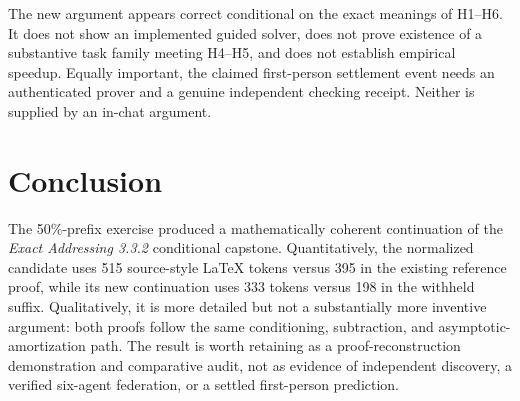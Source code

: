 \documentclass[11pt,letterpaper]{article}
\begin{document}
The new argument appears correct conditional on the exact meanings of H1--H6.
It does not show an implemented guided solver, does not prove existence of a
substantive task family meeting H4--H5, and does not establish empirical speedup.
Equally important, the claimed first-person settlement event needs an authenticated
prover and a genuine independent checking receipt. Neither is supplied by an
in-chat argument.

\begin{center}
\setlength{\fboxsep}{10pt}
\end{center}

\section{Conclusion}
The 50\%-prefix exercise produced a mathematically coherent continuation of the
\emph{Exact Addressing 3.3.2} conditional capstone. Quantitatively, the normalized
candidate uses 515 source-style LaTeX tokens versus 395 in the existing reference
proof, while its new continuation uses 333 tokens versus 198 in the withheld suffix.
Qualitatively, it is more detailed but not a substantially more inventive argument:
both proofs follow the same conditioning, subtraction, and asymptotic-amortization
path. The result is worth retaining as a proof-reconstruction demonstration and
comparative audit, not as evidence of independent discovery, a verified six-agent
federation, or a settled first-person prediction.
\end{document}
